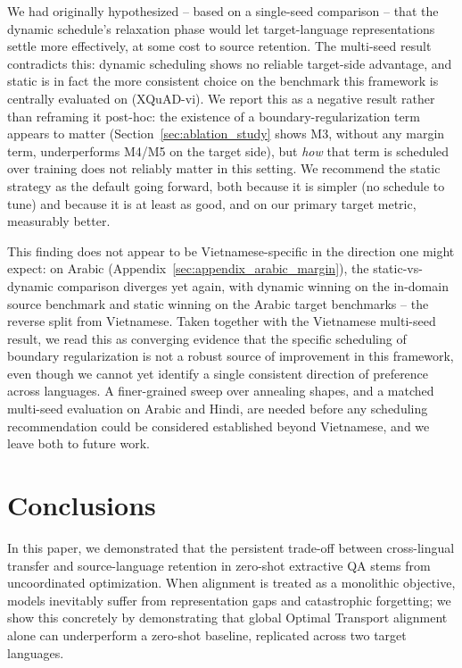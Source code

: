 \documentclass[11pt]{article}
\begin{document}
We had originally hypothesized -- based on a single-seed comparison -- that the dynamic schedule's relaxation phase would let target-language representations settle more effectively, at some cost to source retention. The multi-seed result contradicts this: dynamic scheduling shows no reliable target-side advantage, and static is in fact the more consistent choice on the benchmark this framework is centrally evaluated on (XQuAD-vi). We report this as a negative result rather than reframing it post-hoc: the existence of a boundary-regularization term appears to matter (Section~\ref{sec:ablation_study} shows M3, without any margin term, underperforms M4/M5 on the target side), but \emph{how} that term is scheduled over training does not reliably matter in this setting. We recommend the static strategy as the default going forward, both because it is simpler (no schedule to tune) and because it is at least as good, and on our primary target metric, measurably better.

This finding does not appear to be Vietnamese-specific in the direction one might expect: on Arabic (Appendix~\ref{sec:appendix_arabic_margin}), the static-vs-dynamic comparison diverges yet again, with dynamic winning on the in-domain source benchmark and static winning on the Arabic target benchmarks -- the reverse split from Vietnamese. Taken together with the Vietnamese multi-seed result, we read this as converging evidence that the specific scheduling of boundary regularization is not a robust source of improvement in this framework, even though we cannot yet identify a single consistent direction of preference across languages. A finer-grained sweep over annealing shapes, and a matched multi-seed evaluation on Arabic and Hindi, are needed before any scheduling recommendation could be considered established beyond Vietnamese, and we leave both to future work.

\section{Conclusions}
In this paper, we demonstrated that the persistent trade-off between cross-lingual transfer and source-language retention in zero-shot extractive QA stems from uncoordinated optimization. When alignment is treated as a monolithic objective, models inevitably suffer from representation gaps and catastrophic forgetting; we show this concretely by demonstrating that global Optimal Transport alignment alone can underperform a zero-shot baseline, replicated across two target languages.
\end{document}
